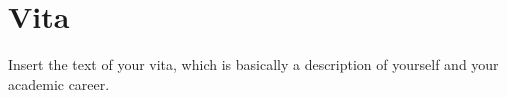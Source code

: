 \documentclass[12pt,letterpaper]{lsuetd}
\begin{document}
% 


\chapter*{Vita}
\doublespacing
\setlength{\parindent}{1.75em}
\vspace{0.2em}
Insert the text of your vita, which is basically a description of yourself and your academic career.
\end{document}
